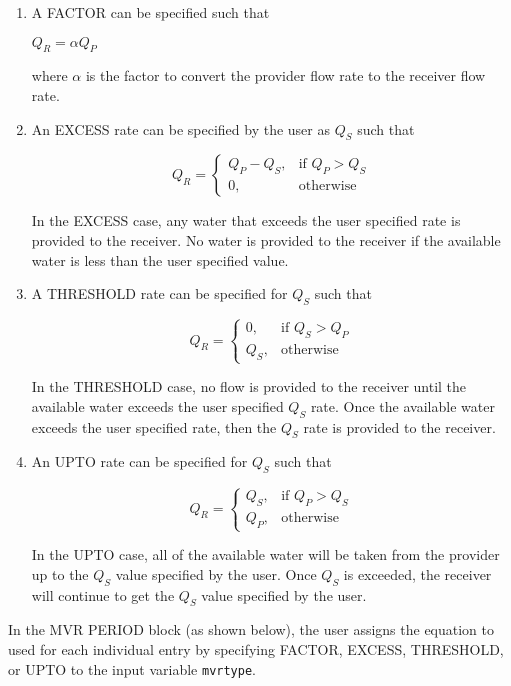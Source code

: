 \begin{enumerate}
\item A FACTOR can be specified such that 

$Q_R = \alpha Q_P$

\noindent where $\alpha$ is the factor to convert the provider flow rate to the receiver flow rate.

\item An EXCESS rate can be specified by the user as $Q_S$ such that

\[
    Q_R = 
\begin{cases}
    Q_P - Q_S, & \text{if } Q_P > Q_S \\
    0,              & \text{otherwise}
\end{cases}
\]

\noindent In the EXCESS case, any water that exceeds the user specified rate is provided to the receiver.  No water is provided to the receiver if the available water is less than the user specified value.

\item A THRESHOLD rate can be specified for $Q_S$ such that

\[
    Q_R = 
\begin{cases}
    0, & \text{if } Q_S > Q_P \\
    Q_S,              & \text{otherwise}
\end{cases}
\]

\noindent In the THRESHOLD case, no flow is provided to the receiver until the available water exceeds the user specified $Q_S$ rate.  Once the available water exceeds the user specified rate, then the $Q_S$ rate is provided to the receiver.

\item An UPTO rate can be specified for $Q_S$ such that

\[
    Q_R = 
\begin{cases}
    Q_S, & \text{if } Q_P > Q_S \\
    Q_P,              & \text{otherwise}
\end{cases}
\]

\noindent In the UPTO case, all of the available water will be taken from the provider up to the $Q_S$ value specified by the user.  Once $Q_S$ is exceeded, the receiver will continue to get the $Q_S$ value specified by the user.
\end{enumerate}

\noindent In the MVR PERIOD block (as shown below), the user assigns the  equation to used for each individual entry by specifying FACTOR, EXCESS, THRESHOLD, or UPTO to the input variable \texttt{mvrtype}.

